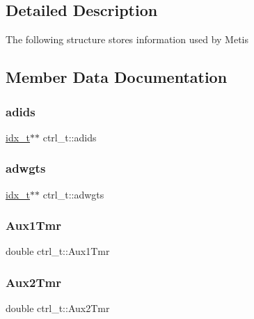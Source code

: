 \subsection{Detailed Description}
The following structure stores information used by Metis 

\subsection{Member Data Documentation}
\mbox{\label{a00742_a483d832bdceddc91d7a727ca32d35a8f}} 
\subsubsection{\texorpdfstring{adids}{adids}}
{\footnotesize\ttfamily \hyperlink{a00876_aaa5262be3e700770163401acb0150f52}{idx\+\_\+t}$\ast$$\ast$ ctrl\+\_\+t\+::adids}

\mbox{\label{a00742_a7c457a43ad89aaf416e79416ca63d779}} 
\subsubsection{\texorpdfstring{adwgts}{adwgts}}
{\footnotesize\ttfamily \hyperlink{a00876_aaa5262be3e700770163401acb0150f52}{idx\+\_\+t}$\ast$$\ast$ ctrl\+\_\+t\+::adwgts}

\mbox{\label{a00742_a8e5e7e5e6e0a2d3585180a1724ef46dc}} 
\subsubsection{\texorpdfstring{Aux1\+Tmr}{Aux1Tmr}}
{\footnotesize\ttfamily double ctrl\+\_\+t\+::\+Aux1\+Tmr}

\mbox{\label{a00742_a280b66beb62416ce1ba7149b1fdddf34}} 
\subsubsection{\texorpdfstring{Aux2\+Tmr}{Aux2Tmr}}
{\footnotesize\ttfamily double ctrl\+\_\+t\+::\+Aux2\+Tmr}

